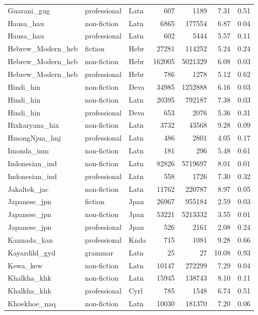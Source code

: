\begin{longtable}{lllrrrr}
  Guarani\_gug & professional & Latn & 607 & 1189 & 7.31 & 0.51 \\ 
  Hausa\_hau & non-fiction & Latn & 6865 & 177554 & 6.87 & 0.04 \\ 
  Hausa\_hau & professional & Latn & 602 & 5444 & 5.57 & 0.11 \\ 
  Hebrew\_Modern\_heb & fiction & Hebr & 27281 & 114252 & 5.24 & 0.24 \\ 
  Hebrew\_Modern\_heb & non-fiction & Hebr & 162005 & 5021329 & 6.08 & 0.03 \\ 
  Hebrew\_Modern\_heb & professional & Hebr & 786 & 1278 & 5.12 & 0.62 \\ 
  Hindi\_hin & non-fiction & Deva & 34985 & 1252888 & 6.16 & 0.03 \\ 
  Hindi\_hin & non-fiction & Latn & 20395 & 792187 & 7.38 & 0.03 \\ 
  Hindi\_hin & professional & Deva & 653 & 2076 & 5.36 & 0.31 \\ 
  Hixkaryana\_hix & non-fiction & Latn & 3732 & 43568 & 9.28 & 0.09 \\ 
  HmongNjua\_hnj & professional & Latn & 486 & 2801 & 4.05 & 0.17 \\ 
  Imonda\_imn & non-fiction & Latn & 181 & 296 & 5.48 & 0.61 \\ 
  Indonesian\_ind & non-fiction & Latn & 82826 & 5719697 & 8.01 & 0.01 \\ 
  Indonesian\_ind & professional & Latn & 558 & 1726 & 7.30 & 0.32 \\ 
  Jakaltek\_jac & non-fiction & Latn & 11762 & 220787 & 8.97 & 0.05 \\ 
  Japanese\_jpn & fiction & Jpan & 26967 & 955184 & 2.59 & 0.03 \\ 
  Japanese\_jpn & non-fiction & Jpan & 53221 & 5213332 & 3.55 & 0.01 \\ 
  Japanese\_jpn & professional & Jpan & 526 & 2161 & 2.08 & 0.24 \\ 
  Kannada\_kan & professional & Knda & 715 & 1081 & 9.28 & 0.66 \\ 
  Kayardild\_gyd & grammar & Latn & 25 & 27 & 10.08 & 0.93 \\ 
  Kewa\_kew & non-fiction & Latn & 10147 & 272299 & 7.29 & 0.04 \\ 
  Khalkha\_khk & non-fiction & Latn & 15945 & 138743 & 8.10 & 0.11 \\ 
  Khalkha\_khk & professional & Cyrl & 785 & 1548 & 6.74 & 0.51 \\ 
  Khoekhoe\_naq & non-fiction & Latn & 10030 & 181370 & 7.20 & 0.06 \\ 

\end{longtable}
